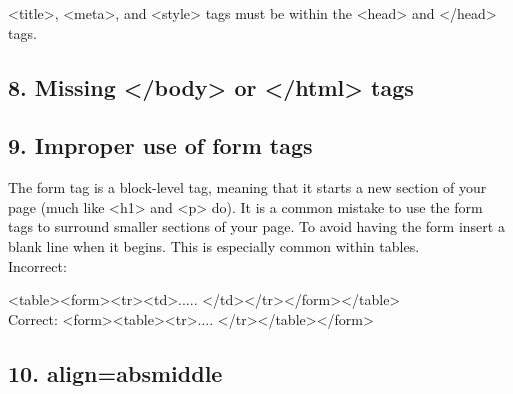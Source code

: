 \documentclass[12pt]{report}
\renewcommand{\_}{\kern-1.5pt\textunderscore\kern-1.5pt}
\begin{document}
\begin{adjustwidth}{0.2in}{0.84in}
\textcolor[HTML]{0D0D0D}{<title>, <meta>, and <style> tags must be within the <head> and </head> tags.}\par

\end{adjustwidth}

\begin{adjustwidth}{0.2in}{0.84in}
\subsection*{8. Missing </body> or </html> tags}
\end{adjustwidth}


\vspace{\baselineskip}\begin{adjustwidth}{0.2in}{0.84in}
\subsection*{9. Improper use of form tags}
\end{adjustwidth}

\begin{adjustwidth}{0.2in}{0.84in}
\textcolor[HTML]{0D0D0D}{The form tag is a block-level tag, meaning that it starts a new section of your page (much like <h1> and <p> do). It is a common mistake to use the form tags to surround smaller sections of your page. To avoid having the form insert a blank line when it begins. This is especially common within tables.\\
Incorrect:}\par

\end{adjustwidth}

\begin{adjustwidth}{0.2in}{0.84in}
\textcolor[HTML]{0D0D0D}{<table><form><tr><td>..... </td></tr></form></table>\\
Correct: <form><table><tr>.... </tr></table></form>}\par

\end{adjustwidth}

\begin{adjustwidth}{0.2in}{0.84in}
\subsection*{10. align=absmiddle}
\end{adjustwidth}
\end{document}
